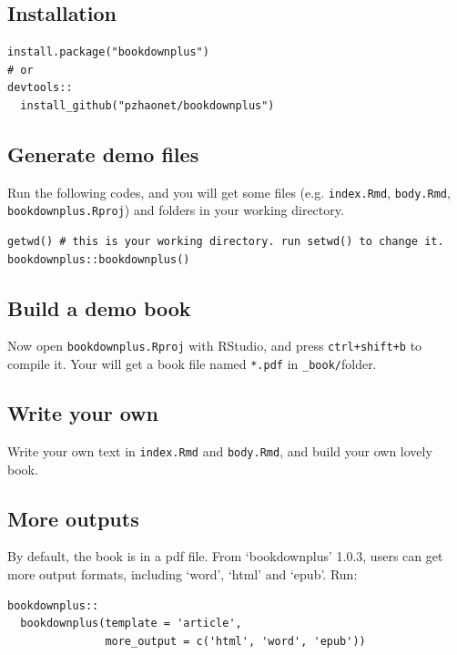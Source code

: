 \documentclass[]{book}
\theoremstyle{definition}
\theoremstyle{definition}
\theoremstyle{definition}
\theoremstyle{remark}
\begin{document}
\subsection{Installation}\label{installation}

\begin{verbatim}
install.package("bookdownplus")
# or
devtools::
  install_github("pzhaonet/bookdownplus")
\end{verbatim}

\subsection{Generate demo files}\label{generate-demo-files}

Run the following codes, and you will get some files (e.g.
\texttt{index.Rmd}, \texttt{body.Rmd}, \texttt{bookdownplus.Rproj}) and
folders in your working directory.

\begin{verbatim}
getwd() # this is your working directory. run setwd() to change it.
bookdownplus::bookdownplus()
\end{verbatim}

\subsection{Build a demo book}\label{build-a-demo-book}

Now open \texttt{bookdownplus.Rproj} with RStudio, and press
\texttt{ctrl+shift+b} to compile it. Your will get a book file named
\texttt{*.pdf} in \texttt{\_book/}folder.

\subsection{Write your own}\label{write-your-own}

Write your own text in \texttt{index.Rmd} and \texttt{body.Rmd}, and
build your own lovely book.

\subsection{More outputs}\label{more-outputs}

By default, the book is in a pdf file. From `bookdownplus' 1.0.3, users
can get more output formats, including `word', `html' and `epub'. Run:

\begin{verbatim}
bookdownplus::
  bookdownplus(template = 'article', 
               more_output = c('html', 'word', 'epub'))
\end{verbatim}
\end{document}

